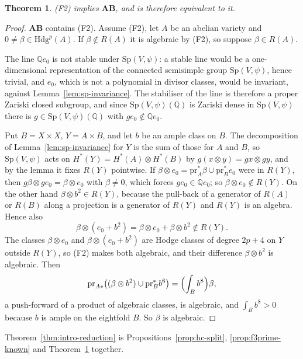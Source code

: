 \documentclass[11pt,reqno]{amsart}
\numberwithin{equation}{section}
\theoremstyle{plain}
\newtheorem{theorem}{Theorem}[section]
\theoremstyle{definition}
\newcommand{\QQ}{\mathbb{Q}}
\newcommand{\Hdg}{\mathrm{Hdg}}
\newcommand{\Sp}{\mathrm{Sp}}
\newcommand{\AB}{\mathbf{AB}}
\newcommand{\Fii}{\texorpdfstring{\textup{(F2)}}{(F2)}}
\begin{document}
\begin{theorem}\label{thm:f2isab}
\Fii{} implies $\AB$, and is therefore equivalent to it.
\end{theorem}

\begin{proof}
$\AB$ contains \Fii{}. Assume \Fii{}, let $A$ be an abelian variety and $0\ne\beta\in\Hdg^{p}(A)$. If $\beta\notin R(A)$ it is algebraic by \Fii{}, so suppose $\beta\in R(A)$.

The line $\QQ e_{0}$ is not stable under $\Sp(V,\psi)$: a stable line would be a one-dimensional representation of the connected semisimple group $\Sp(V,\psi)$, hence trivial, and $e_{0}$, which is not a polynomial in divisor classes, would be invariant, against Lemma~\ref{lem:sp-invariance}. The stabiliser of the line is therefore a proper Zariski closed subgroup, and since $\Sp(V,\psi)(\QQ)$ is Zariski dense in $\Sp(V,\psi)$ \cite[Cor.~18.3]{Bor91} there is $g\in\Sp(V,\psi)(\QQ)$ with $ge_{0}\notin\QQ e_{0}$.

Put $B=X\times X$, $Y=A\times B$, and let $b$ be an ample class on $B$. The decomposition of Lemma~\ref{lem:sp-invariance} for $Y$ is the sum of those for $A$ and $B$, so $\Sp(V,\psi)$ acts on $H^{*}(Y)=H^{*}(A)\otimes H^{*}(B)$ by $g(x\otimes y)=gx\otimes gy$, and by the lemma it fixes $R(Y)$ pointwise. If $\beta\otimes e_{0}=\mathrm{pr}_{A}^{*}\beta\cup\mathrm{pr}_{B}^{*}e_{0}$ were in $R(Y)$, then $g\beta\otimes ge_{0}=\beta\otimes e_{0}$ with $\beta\ne0$, which forces $ge_{0}\in\QQ e_{0}$; so $\beta\otimes e_{0}\notin R(Y)$. On the other hand $\beta\otimes b^{2}\in R(Y)$, because the pull-back of a generator of $R(A)$ or $R(B)$ along a projection is a generator of $R(Y)$ and $R(Y)$ is an algebra. Hence also
\[
\beta\otimes(e_{0}+b^{2})=\beta\otimes e_{0}+\beta\otimes b^{2}\notin R(Y).
\]
The classes $\beta\otimes e_{0}$ and $\beta\otimes(e_{0}+b^{2})$ are Hodge classes of degree $2p+4$ on $Y$ outside $R(Y)$, so \Fii{} makes both algebraic, and their difference $\beta\otimes b^{2}$ is algebraic. Then
\[
\mathrm{pr}_{A*}\bigl((\beta\otimes b^{2})\cup\mathrm{pr}_{B}^{*}b^{6}\bigr)=\Bigl(\int_{B}b^{8}\Bigr)\beta,
\]
a push-forward of a product of algebraic classes, is algebraic, and $\int_{B}b^{8}>0$ because $b$ is ample on the eightfold $B$. So $\beta$ is algebraic.
\end{proof}

Theorem~\ref{thm:intro-reduction} is Propositions~\ref{prop:hc-split}, \ref{prop:f3prime-known} and Theorem~\ref{thm:f2isab} together.
\end{document}
